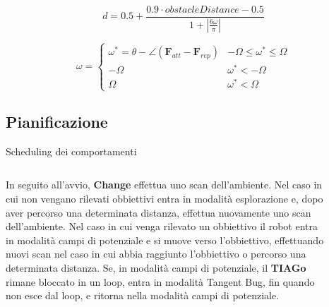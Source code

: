 \documentclass[10pt]{beamer}
\begin{document}
	\begin{equation}\label{eq:translation}
		d = 0.5 + \frac	{0.9\cdot obstacleDistance - 0.5}
		{1 + \left|
				\frac{6\omega}{\pi}
		\right|  } 
	\end{equation}
	
	\begin{equation}\label{eq:angle}
		\omega = \begin{cases}
			\omega^*=\theta - \angle\left( \textbf{F}_{att} - \textbf{F}_{rep} \right)  & -\Omega \le \omega^* \le \Omega \\
			-\Omega & \omega^* < -\Omega \\
			\Omega & \omega^* < \Omega

		\end{cases}	\end{equation}
	
	\subsection{Pianificazione}\label{subsec:Pianificazione}
	\begin{frame}{Scheduling dei comportamenti}
		
		\begin{columns}
			\begin{column}{0.5\textwidth}
				In seguito all'avvio, \textbf{Change} effettua uno scan
				dell'ambiente.  Nel caso in cui non vengano rilevati obbiettivi
				entra in modalità esplorazione e, dopo aver percorso una
				determinata distanza, effettua nuovamente uno scan
				dell'ambiente. Nel caso in cui venga rilevato un obbiettivo il
				robot entra in modalità campi di potenziale e si muove verso
				l'obbiettivo, effettuando nuovi scan nel caso in cui abbia
				raggiunto l'obbiettivo o percorso una determinata
				distanza. Se, in modalità campi di potenziale, il
				\textbf{TIAGo} rimane bloccato in un loop, entra in modalità
				Tangent Bug, fin quando non esce dal loop, e ritorna nella
				modalità campi di potenziale.
			\end{column}
			
			\begin{column}{0.5\textwidth}
				\begin{figure}[H]
					\centering
					\texttt{[image: ./img/fsa.pdf]}
					\label{fig:fsa}
				\end{figure}
			\end{column}
		\end{columns}
	\end{frame}
	
\end{document}
